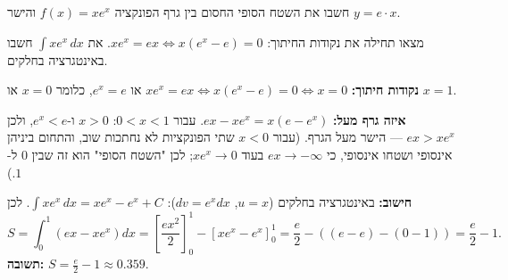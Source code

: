 
\begin{question}
חשבו את השטח הסופי החסום בין גרף הפונקציה $f(x) = xe^x$ והישר $y = e\cdot x$.
\end{question}

\begin{hint}
מצאו תחילה את נקודות החיתוך: $xe^x = ex \iff x(e^x - e) = 0$. את $\int xe^x\,dx$ חשבו באינטגרציה בחלקים.
\end{hint}

\begin{solution}
\textbf{נקודות חיתוך:} $xe^x = ex \iff x(e^x - e) = 0 \iff x = 0$ או $e^x = e$, כלומר $x = 0$ או $x = 1$.

\textbf{איזה גרף מעל:} $ex - xe^x = x(e - e^x)$. עבור $0 < x < 1$: $x > 0$ ו-$e^x < e$, ולכן $ex > xe^x$ — הישר מעל הגרף.
(עבור $x < 0$ שתי הפונקציות לא נחתכות שוב, והתחום ביניהן אינסופי ושטחו אינסופי, כי $ex \to -\infty$ בעוד $xe^x \to 0$; לכן "השטח הסופי" הוא זה שבין $0$ ל-$1$.)

\textbf{חישוב:} באינטגרציה בחלקים ($u = x$, $dv = e^xdx$): $\int xe^x\,dx = xe^x - e^x + C$. לכן
\[ S = \int_0^1\left(ex - xe^x\right)dx = \left[\frac{ex^2}{2}\right]_0^1 - \left[xe^x - e^x\right]_0^1 = \frac e2 - \left((e - e) - (0 - 1)\right) = \frac e2 - 1. \]
\textbf{תשובה:} $S = \frac e2 - 1 \approx 0.359$.
\end{solution}
